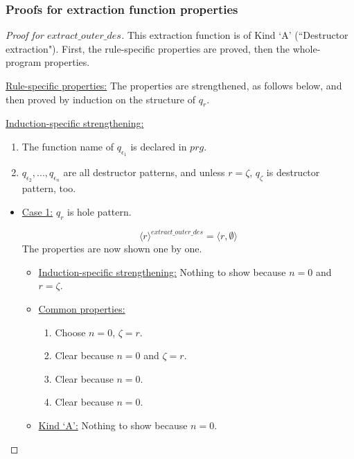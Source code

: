 \documentclass[11pt]{article} %
\begin{document}

\subsubsection{Proofs for extraction function properties}

\begin{proof}[Proof for $extract\_outer\_des$]

This extraction function is of Kind `A' (``Destructor extraction"). First, the rule-specific properties are proved, then the whole-program properties.

\underline{Rule-specific properties:} The properties are strengthened, as follows below, and then proved by induction on the structure of $q_r$.

\underline{Induction-specific strengthening:}
\begin{enumerate}
\item The function name of $q_{\epsilon_1}$ is declared in $prg$.
\item $q_{\epsilon_2}, ..., q_{\epsilon_n}$ are all destructor patterns, and unless $r = \zeta$, $q_\zeta$ is destructor pattern, too.
\end{enumerate}

\begin{itemize}

\item \underline{Case 1:} $q_r$ is hole pattern.

\begin{equation*}
\langle r \rangle^{extract\_outer\_des} = \big\langle r, \emptyset \big\rangle
\end{equation*}
The properties are now shown one by one.
\begin{itemize}
\item \underline{Induction-specific strengthening:} Nothing to show because $n = 0$ and $r = \zeta$.

\item \underline{Common properties:}
\begin{enumerate}
\item Choose $n = 0$, $\zeta = r$.
\item Clear because $n = 0$ and $\zeta = r$.
\item Clear because $n = 0$.
\item Clear because $n = 0$.
\end{enumerate}

\item \underline{Kind `A':} Nothing to show because $n = 0$.
\end{itemize}


\end{itemize}
\end{proof}
\end{document}
